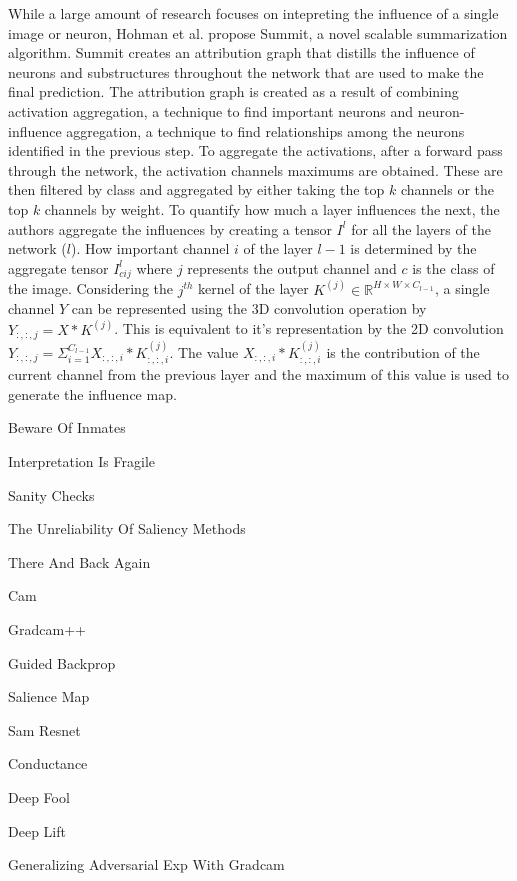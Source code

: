 While a large amount of research focuses on intepreting the influence of a single image or neuron, Hohman et al. propose Summit, \cite{hohmanSummitScalingDeep2019} a novel scalable summarization algorithm. Summit creates an attribution graph that distills the influence of neurons and substructures throughout the network that are used to make the final prediction. The attribution graph is created as a result of combining activation aggregation, a technique to find important neurons and neuron-influence aggregation, a technique to find relationships among the neurons identified in the previous step. To aggregate the activations, after a forward pass through the network, the activation channels maximums are obtained. These are then filtered by class and aggregated by either taking the top $k$ channels or the top $k$ channels by weight. To quantify how much a layer influences the next, the authors aggregate the influences by creating a tensor $I^{l}$ for all the layers of the network ($l$). How important channel $i$ of the layer $l-1$ is determined by the aggregate tensor $I^{l}_{cij}$ where $j$ represents the output channel and $c$ is the class of the image. Considering the $j^{th}$ kernel of the layer $K^{(j)} \in \mathbb{R}^{H \times W \times C_{l-1}}$, a single channel $Y$ can be represented using the 3D convolution operation by $Y_{:,:,j}= X \ast K^{(j)}$. This is equivalent to it's representation by the 2D convolution $Y_{:,:,j}= \Sigma_{i=1}^{C_{l-1}} X_{:,:,i} \ast K^{(j)}_{:,:,i}$. The value $X_{:,:,i} \ast K^{(j)}_{:,:,i}$ is the contribution of the current channel from the previous layer and the maximum of this value is used to generate the influence map.

Beware Of Inmates

Interpretation Is Fragile

Sanity Checks

The Unreliability Of Saliency Methods

There And Back Again



Cam

Gradcam++

Guided Backprop

Salience Map

Sam Resnet

Conductance

Deep Fool

Deep Lift

Generalizing Adversarial Exp With Gradcam


